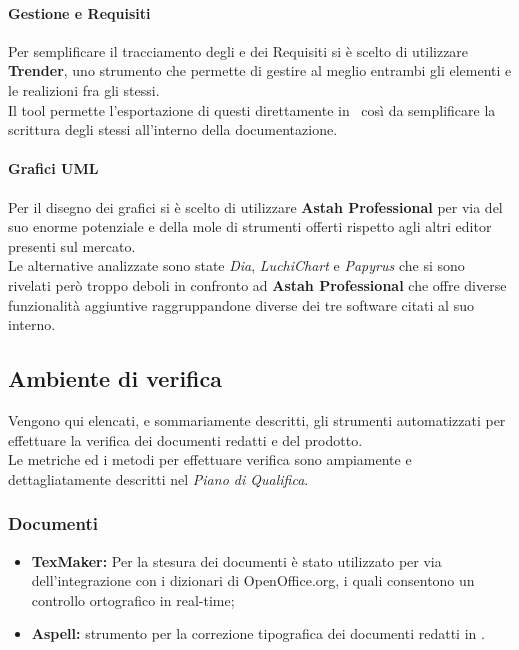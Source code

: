      \paragraph{Gestione  e Requisiti}
        Per semplificare il tracciamento degli  e dei Requisiti si è scelto di utilizzare \textbf{Trender}, uno strumento  che permette
        di gestire al meglio entrambi gli elementi e le realizioni fra gli stessi.\\
        Il tool permette l'esportazione di questi direttamente in \glossaryItem{\LaTeX}\, così da semplificare la scrittura degli stessi all'interno della documentazione.
    \paragraph{Grafici UML}
      Per il disegno dei grafici  si è scelto di utilizzare \textbf{Astah Professional} per via del suo enorme potenziale e della mole di strumenti offerti
      rispetto agli altri editor presenti sul mercato.\\
      Le alternative analizzate sono state \emph{Dia}, \emph{LuchiChart} e \emph{Papyrus} che si sono rivelati però troppo deboli in confronto ad \textbf{Astah Professional} che offre
      diverse funzionalità aggiuntive raggruppandone diverse dei tre software citati al suo interno.
  \subsection{Ambiente di verifica}
    Vengono qui elencati, e sommariamente descritti, gli strumenti automatizzati per effettuare la verifica dei documenti redatti e del  prodotto.\\
    Le metriche ed i metodi per effettuare verifica sono ampiamente e dettagliatamente descritti nel \emph{Piano di Qualifica}.\\
    \subsubsection{Documenti}
      \begin{itemize}
        \item \textbf{TexMaker: }Per la stesura dei documenti è stato utilizzato  per via dell'integrazione con i dizionari di OpenOffice.org, i quali consentono un controllo ortografico in real-time;
        \item \textbf{Aspell: }strumento per la correzione tipografica dei documenti redatti in \glossaryItem{\LaTeX}.
      \end{itemize}

